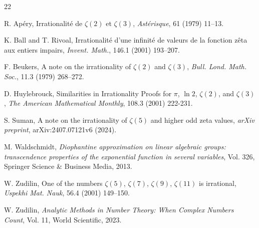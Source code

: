 \documentclass[12pt,reqno]{amsart}
\theoremstyle{definition}
\numberwithin{equation}{section}
\begin{document}
	
	
\begin{thebibliography}{22}

 R. Ap\'{e}ry, Irrationalit\'{e} de $\zeta(2)$ et $\zeta(3)$, \emph{Ast\'{e}risque}, 61 (1979) 11--13.

 K. Ball and T. Rivoal, Irrationalit\'{e} d’une infinit\'{e} de valeurs de la fonction z\^{e}ta aux entiers impairs, \emph{Invent. Math.}, 146.1 (2001) 193--207.


 F. Beukers, A note on the irrationality of $\zeta(2)$ and $\zeta(3)$, \emph{Bull. Lond. Math. Soc.}, 11.3 (1979) 268–272.

D. Huylebrouck, Similarities in Irrationality Proofs for \(\pi\), \(\ln 2\), \(\zeta(2)\), and \(\zeta(3)\), \emph{The American Mathematical Monthly}, 108.3 (2001) 222-231.

 S. Suman, A note on the irrationality of \(\zeta(5)\) and higher odd zeta values, \emph{arXiv preprint}, arXiv:2407.07121v6 (2024).

 M. Waldschmidt, \emph{Diophantine approximation on linear algebraic groups: transcendence properties of the exponential function in several variables}, Vol. 326, Springer Science \& Business Media, 2013.

 W. Zudilin, One of the numbers $\zeta(5)$, $\zeta(7)$, $\zeta(9)$, $\zeta(11)$ is irrational, \emph{Uspekhi Mat. Nauk}, 56.4 (2001) 149–150.

W. Zudilin, \emph{Analytic Methods in Number Theory: When Complex Numbers Count}, Vol. 11, World Scientific, 2023.
	
	
\end{thebibliography}
\end{document}
